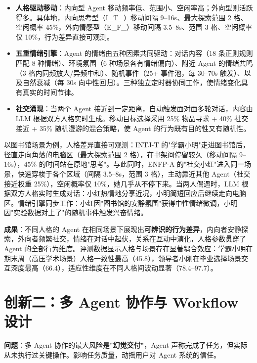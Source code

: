 \documentclass[12pt,a4paper]{article}%
\begin{document}
\begin{itemize}
	\item \textbf{人格驱动移动}：内向型 Agent 移动频率低、范围小、空闲率高；外向型则活跃得多。具体地，内向思考型（I\_T\_）移动间隔 9--16s、最大探索范围 2 格、空闲概率 45\%，外向情感型（E\_F\_）移动间隔 3.5--8s、范围 3 格、空闲概率仅 10\%，行为差异直接可观测。
	\item \textbf{五重情绪引擎}：Agent 的情绪由五种因素共同驱动：对话内容（18 条正则规则匹配 8 种情绪）、环境氛围（6 种场景各有情绪偏向）、附近 Agent 的情绪共鸣（3 格内同频放大/异频中和）、随机事件（25+ 事件池，每 30--70s 触发）、以及自然衰减（每 30s 向中性回归）。三种独立定时器协同工作，使情绪变化具有真实的时间节律。
	\item \textbf{社交涌现}：当两个 Agent 接近到一定距离，自动触发面对面多轮对话，内容由 LLM 根据双方人格实时生成。移动目标选择采用 25\% 物品寻求 + 40\% 社交接近 + 35\% 随机漫游的混合策略，使 Agent 的行为既有目的性又有随机性。
\end{itemize}

以图书馆场景为例，人格差异直接可观测：INTJ-T 的"学霸小明"走进图书馆后，径直走向角落的电脑区（最大探索范围 2 格），在书架间停留较久（移动间隔 9--16s），45\% 的时间站在原地"思考"。与此同时，ENFP-A 的"社交小红"进入同一场景，快速穿梭于各个区域（间隔 3.5--8s，范围 3 格），主动靠近其他 Agent（社交接近权重 25\%），空闲概率仅 10\%，她几乎从不停下来。当两人偶遇时，LLM 根据双方人格实时生成对话：小红热情地分享近况，小明简短回应后继续走向电脑区。情绪引擎同步工作：小红因"图书馆的安静氛围"获得中性情绪微调，小明因"实验数据对上了"的随机事件触发兴奋情绪。

\textbf{成果}：不同人格的 Agent 在相同场景下展现出\textbf{可辨识的行为差异}，内向者安静探索，外向者频繁社交，情绪在对话中起伏，关系在互动中演化，人格参数贯穿了 Agent 的全部行为维度。评测数据显示人格与场景存在显著耦合效应：学霸小明在期末周（高压学术场景）人格一致性最高（45.8），领导者小刚在毕业选择场景交互深度最高（66.4），适应性维度在不同人格间波动显著（78.4--97.7）。

\section{创新二：多 Agent 协作与 Workflow 设计}

\textbf{问题}：多 Agent 协作的最大风险是\textbf{"幻觉交付"}，Agent 声称完成了任务，但实际从未执行过关键操作。影响任务质量，动摇用户对 Agent 系统的信任。
\end{document}
